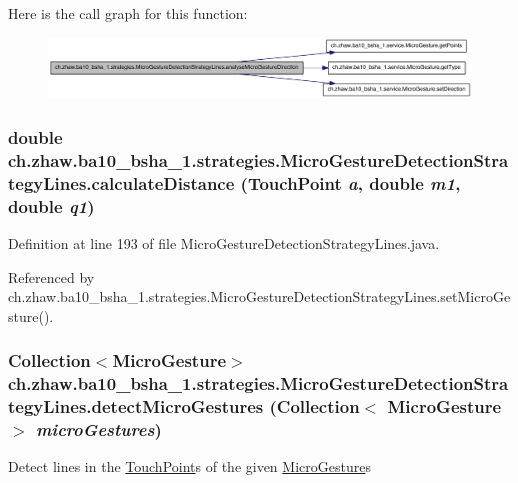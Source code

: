 Here is the call graph for this function:\nopagebreak
\begin{figure}[H]
\begin{center}
\leavevmode
\includegraphics[width=400pt]{classch_1_1zhaw_1_1ba10__bsha__1_1_1strategies_1_1MicroGestureDetectionStrategyLines_ab3ca516ff03d9dc2193d9aaf6afad5e8_cgraph}
\end{center}
\end{figure}
\hypertarget{classch_1_1zhaw_1_1ba10__bsha__1_1_1strategies_1_1MicroGestureDetectionStrategyLines_a752e22e2803dd97ddea5ce9ba6ce9071}{
\subsubsection[{calculateDistance}]{\setlength{\rightskip}{0pt plus 5cm}double ch.zhaw.ba10\_\-bsha\_\-1.strategies.MicroGestureDetectionStrategyLines.calculateDistance ({\bf TouchPoint} {\em a}, \/  double {\em m1}, \/  double {\em q1})}}
\label{classch_1_1zhaw_1_1ba10__bsha__1_1_1strategies_1_1MicroGestureDetectionStrategyLines_a752e22e2803dd97ddea5ce9ba6ce9071}


Definition at line 193 of file MicroGestureDetectionStrategyLines.java.

Referenced by ch.zhaw.ba10\_\-bsha\_\-1.strategies.MicroGestureDetectionStrategyLines.setMicroGesture().\hypertarget{classch_1_1zhaw_1_1ba10__bsha__1_1_1strategies_1_1MicroGestureDetectionStrategyLines_ac4a6ad22e6ca3b595006c0b956fdd208}{
\subsubsection[{detectMicroGestures}]{\setlength{\rightskip}{0pt plus 5cm}Collection$<${\bf MicroGesture}$>$ ch.zhaw.ba10\_\-bsha\_\-1.strategies.MicroGestureDetectionStrategyLines.detectMicroGestures (Collection$<$ {\bf MicroGesture} $>$ {\em microGestures})}}
\label{classch_1_1zhaw_1_1ba10__bsha__1_1_1strategies_1_1MicroGestureDetectionStrategyLines_ac4a6ad22e6ca3b595006c0b956fdd208}
Detect lines in the \hyperlink{classch_1_1zhaw_1_1ba10__bsha__1_1_1TouchPoint}{TouchPoint}s of the given \hyperlink{}{MicroGesture}s



